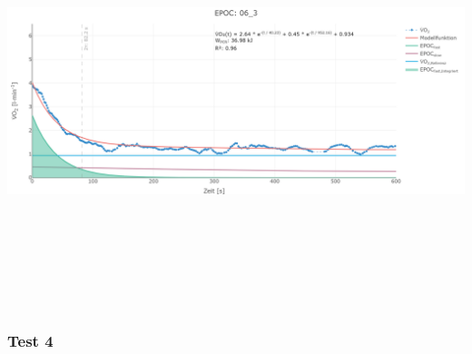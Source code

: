 \documentclass[
  letterpaper,
  DIV=11]{scrartcl}
\begin{document}
\includegraphics[width=11.45833in,height=4.6875in]{images/06_3.png}

\subsubsection{Test 4}
\end{document}
